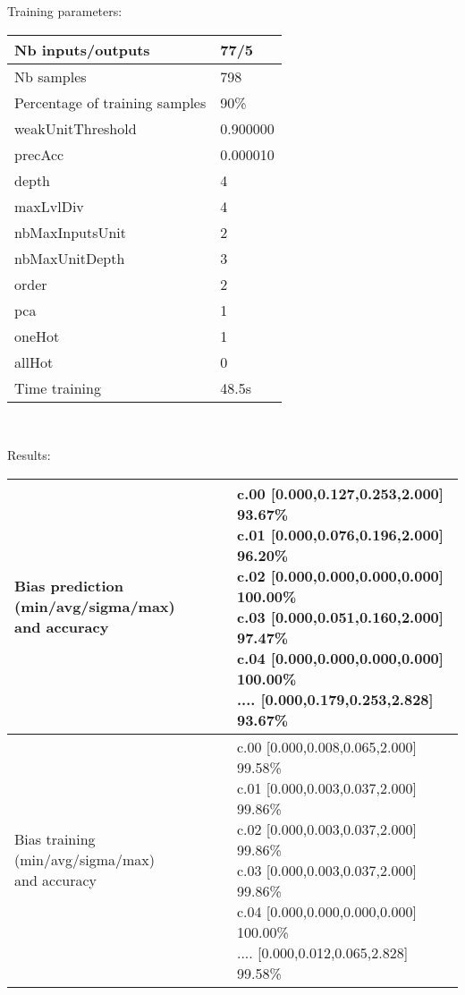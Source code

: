Training parameters:\\
\begin{center}
\begin{tabular}{|l|l|}
\hline
Nb inputs/outputs&77/5\\
\hline
Nb samples&798\\
\hline
Percentage of training samples&90\%\\
\hline
weakUnitThreshold&0.900000\\
\hline
precAcc&0.000010\\
\hline
depth&4\\
\hline
maxLvlDiv&4\\
\hline
nbMaxInputsUnit&2\\
\hline
nbMaxUnitDepth&3\\
\hline
order&2\\
\hline
pca&1\\
\hline
oneHot&1\\
\hline
allHot&0\\
\hline
Time training&48.5s\\
\hline
\end{tabular}\\
\end{center}\newline
Results:
\begin{center}
\begin{tabular}{|l|l|}
\hline
\makecell{Bias prediction (min/avg/sigma/max)\\and accuracy}&\makecell{c.00 [0.000,0.127,0.253,2.000] 93.67\%\\
c.01 [0.000,0.076,0.196,2.000] 96.20\%\\
c.02 [0.000,0.000,0.000,0.000] 100.00\%\\
c.03 [0.000,0.051,0.160,2.000] 97.47\%\\
c.04 [0.000,0.000,0.000,0.000] 100.00\%\\
.... [0.000,0.179,0.253,2.828] 93.67\%\\
}\\

\hline
\makecell{Bias training (min/avg/sigma/max)\\and accuracy}&\makecell{c.00 [0.000,0.008,0.065,2.000] 99.58\%\\
c.01 [0.000,0.003,0.037,2.000] 99.86\%\\
c.02 [0.000,0.003,0.037,2.000] 99.86\%\\
c.03 [0.000,0.003,0.037,2.000] 99.86\%\\
c.04 [0.000,0.000,0.000,0.000] 100.00\%\\
.... [0.000,0.012,0.065,2.828] 99.58\%\\
}\\
\hline
\end{tabular}\
\end{center}
